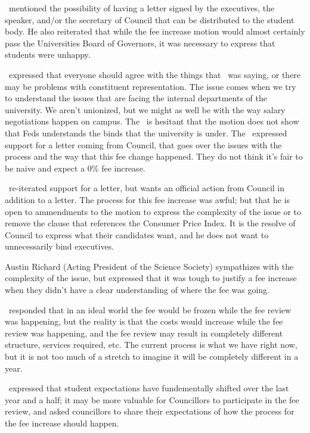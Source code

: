 \begin{motion}
    \seneca\ mentioned the possibility of having a letter signed by the 
    executives, the speaker, and/or the secretary of Council that can be
    distributed to the student body. He also reiterated that while the fee
    increase motion would almost certainly pass the Universities Board of
    Governors, it was necessary to express that students were unhappy.

    \andrewc\ expressed that everyone should agree with the things that
    \seneca\ was saying, or there may be problems with constituent 
    representation. The issue comes when we try to understand the issues
    that are facing the internal departments of the university. We aren't 
    unionized, but we might as well be with the way salary negotiations happen
    on campus. The \vped\ is hesitant that the motion does not show that Feds 
    understands the binds that the university is under. The \vped\ expressed
    support for a letter coming from Council, that goes over the issues with 
    the process and the way that this fee change happened. They do not think 
    it's fair to be naive and expect a 0\% fee increase. 

    \seneca\ re-iterated support for a letter, but wants an official action
    from Council in addition to a letter. The process for this fee increase was
    awful; but that he is open to ammendments to the motion to express the
    complexity of the issue or to remove the clause that references the 
    Consumer Price Index. It is the resolve of Council to express what their
    candidates want, and he does not want to unnecessarily bind executives.

    Austin Richard (Acting President of the Science Society) sympathizes with
    the complexity of the issue, but expressed that it was tough to justify a
    fee increase when they didn't have a clear understanding of where the fee
    was going.

    \coopcom\ responded that in an ideal world the fee would be frozen while
    the fee review was happening, but the reality is that the costs would
    increase while the fee review was happening, and the fee review may result
    in completely different structure, services required, etc. The current
    process is what we have right now, but it is not too much of a stretch to
    imagine it will be completely different in a year.

    \vped\ expressed that student expectations have fundementally shifted over
    the last year and a half; it may be more valuable for Councillors to
    participate in the fee review, and asked councillors to share their
    expectations of how the process for the fee increase should happen.


\end{motion}
